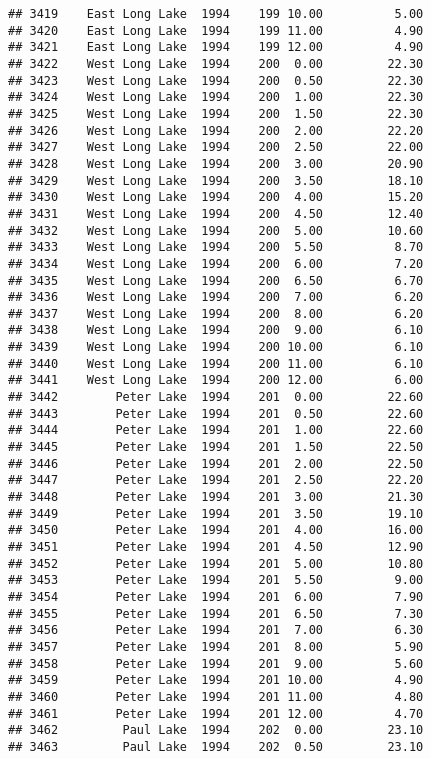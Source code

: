 \documentclass[
]{article}
\begin{document}
\begin{verbatim}
## 3419    East Long Lake  1994    199 10.00          5.00
## 3420    East Long Lake  1994    199 11.00          4.90
## 3421    East Long Lake  1994    199 12.00          4.90
## 3422    West Long Lake  1994    200  0.00         22.30
## 3423    West Long Lake  1994    200  0.50         22.30
## 3424    West Long Lake  1994    200  1.00         22.30
## 3425    West Long Lake  1994    200  1.50         22.30
## 3426    West Long Lake  1994    200  2.00         22.20
## 3427    West Long Lake  1994    200  2.50         22.00
## 3428    West Long Lake  1994    200  3.00         20.90
## 3429    West Long Lake  1994    200  3.50         18.10
## 3430    West Long Lake  1994    200  4.00         15.20
## 3431    West Long Lake  1994    200  4.50         12.40
## 3432    West Long Lake  1994    200  5.00         10.60
## 3433    West Long Lake  1994    200  5.50          8.70
## 3434    West Long Lake  1994    200  6.00          7.20
## 3435    West Long Lake  1994    200  6.50          6.70
## 3436    West Long Lake  1994    200  7.00          6.20
## 3437    West Long Lake  1994    200  8.00          6.20
## 3438    West Long Lake  1994    200  9.00          6.10
## 3439    West Long Lake  1994    200 10.00          6.10
## 3440    West Long Lake  1994    200 11.00          6.10
## 3441    West Long Lake  1994    200 12.00          6.00
## 3442        Peter Lake  1994    201  0.00         22.60
## 3443        Peter Lake  1994    201  0.50         22.60
## 3444        Peter Lake  1994    201  1.00         22.60
## 3445        Peter Lake  1994    201  1.50         22.50
## 3446        Peter Lake  1994    201  2.00         22.50
## 3447        Peter Lake  1994    201  2.50         22.20
## 3448        Peter Lake  1994    201  3.00         21.30
## 3449        Peter Lake  1994    201  3.50         19.10
## 3450        Peter Lake  1994    201  4.00         16.00
## 3451        Peter Lake  1994    201  4.50         12.90
## 3452        Peter Lake  1994    201  5.00         10.80
## 3453        Peter Lake  1994    201  5.50          9.00
## 3454        Peter Lake  1994    201  6.00          7.90
## 3455        Peter Lake  1994    201  6.50          7.30
## 3456        Peter Lake  1994    201  7.00          6.30
## 3457        Peter Lake  1994    201  8.00          5.90
## 3458        Peter Lake  1994    201  9.00          5.60
## 3459        Peter Lake  1994    201 10.00          4.90
## 3460        Peter Lake  1994    201 11.00          4.80
## 3461        Peter Lake  1994    201 12.00          4.70
## 3462         Paul Lake  1994    202  0.00         23.10
## 3463         Paul Lake  1994    202  0.50         23.10

\end{verbatim}
\end{document}
